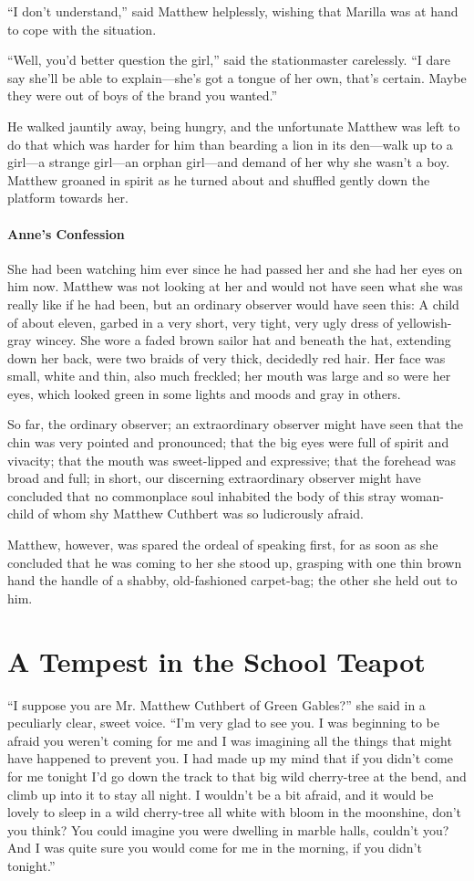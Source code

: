 \documentclass{article}
\begin{document}
``I don't understand,'' said Matthew helplessly, wishing that Marilla was at hand to cope with the situation.

``Well, you'd better question the girl,'' said the stationmaster carelessly. ``I dare say she'll be able to explain---she's got a tongue of her own, that's certain. Maybe they were out of boys of the brand you wanted.''

He walked jauntily away, being hungry, and the unfortunate Matthew was left to do that which was harder for him than bearding a lion in its den---walk up to a girl---a strange girl---an orphan girl---and demand of her why she wasn't a boy. Matthew groaned in spirit as he turned about and shuffled gently down the platform towards her.
 
\paragraph{Anne's Confession}
She had been watching him ever since he had passed her and she had her eyes on him now. Matthew was not looking at her and would not have seen what she was really like if he had been, but an ordinary observer would have seen this: A child of about eleven, garbed in a very short, very tight, very ugly dress of yellowish-gray wincey. She wore a faded brown sailor hat and beneath the hat, extending down her back, were two braids of very thick, decidedly red hair. Her face was small, white and thin, also much freckled; her mouth was large and so were her eyes, which looked green in some lights and moods and gray in others.

So far, the ordinary observer; an extraordinary observer might have seen that the chin was very pointed and pronounced; that the big eyes were full of spirit and vivacity; that the mouth was sweet-lipped and expressive; that the forehead was broad and full; in short, our discerning extraordinary observer might have concluded that no commonplace soul inhabited the body of this stray woman-child of whom shy Matthew Cuthbert was so ludicrously afraid.

Matthew, however, was spared the ordeal of speaking first, for as soon as she concluded that he was coming to her she stood up, grasping with one thin brown hand the handle of a shabby, old-fashioned carpet-bag; the other she held out to him.

\section{A Tempest in the School Teapot}
``I suppose you are Mr. Matthew Cuthbert of Green Gables?'' she said in a peculiarly clear, sweet voice. ``I'm very glad to see you. I was beginning to be afraid you weren't coming for me and I was imagining all the things that might have happened to prevent you. I had made up my mind that if you didn't come for me tonight I'd go down the track to that big wild cherry-tree at the bend, and climb up into it to stay all night. I wouldn't be a bit afraid, and it would be lovely to sleep in a wild cherry-tree all white with bloom in the moonshine, don't you think? You could imagine you were dwelling in marble halls, couldn't you? And I was quite sure you would come for me in the morning, if you didn't tonight.''
\end{document}
